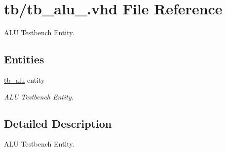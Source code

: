 \hypertarget{tb__alu___8vhd}{}\section{tb/tb\+\_\+alu\+\_\+.vhd File Reference}
\label{tb__alu___8vhd}


A\+LU Testbench Entity.  


\subsection*{Entities}
\begin{DoxyCompactItemize}
\item 
\hyperlink{classtb__alu}{tb\+\_\+alu} entity
\begin{DoxyCompactList}\small\item\em A\+LU Testbench Entity. \end{DoxyCompactList}\end{DoxyCompactItemize}


\subsection{Detailed Description}
A\+LU Testbench Entity. 

